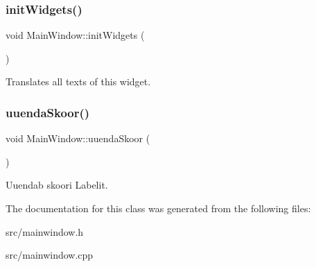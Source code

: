 \subsubsection{\texorpdfstring{initWidgets()}{initWidgets()}}
{\footnotesize\ttfamily void Main\+Window\+::init\+Widgets (\begin{DoxyParamCaption}{ }\end{DoxyParamCaption})\hspace{0.3cm}{\ttfamily [protected]}}

Translates all texts of this widget. \mbox{\label{class_main_window_abc448fe5e16494d3a198018817c38ef6}} 
\subsubsection{\texorpdfstring{uuendaSkoor()}{uuendaSkoor()}}
{\footnotesize\ttfamily void Main\+Window\+::uuenda\+Skoor (\begin{DoxyParamCaption}{ }\end{DoxyParamCaption})}

Uuendab skoori Label\textquotesingle{}it. 

The documentation for this class was generated from the following files\+:\begin{DoxyCompactItemize}
\item 
src/mainwindow.\+h\item 
src/mainwindow.\+cpp\end{DoxyCompactItemize}
